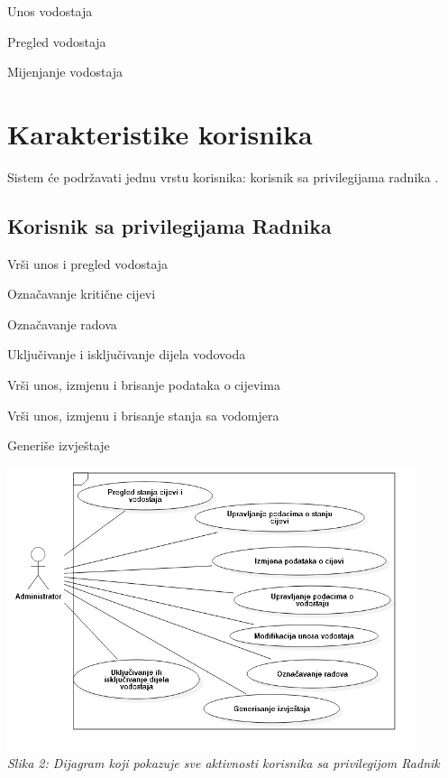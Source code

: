 \documentclass[]{report}
\begin{document}
\begin{compactitem}
\item Unos vodostaja
\item Pregled vodostaja 
\item Mijenjanje vodostaja 
\end{compactitem}

\section{Karakteristike korisnika}

Sistem će podržavati jednu vrstu korisnika: korisnik sa privilegijama radnika . 

\subsection{Korisnik sa privilegijama Radnika}

\begin{compactitem}
\item Vrši unos i pregled vodostaja
\item Označavanje kritične cijevi
\item Označavanje radova
\item Uključivanje i isključivanje dijela vodovoda
\item Vrši unos, izmjenu i brisanje podataka o cijevima 
\item Vrši unos, izmjenu i brisanje stanja sa vodomjera
\item Generiše izvještaje
\end{compactitem}
\begin{center}
\includegraphics[width=12cm]{uc.png}
\\
\textit{Slika 2:  Dijagram koji pokazuje sve aktivnosti korisnika sa privilegijom Radnik}
\end{center}
\end{document}
